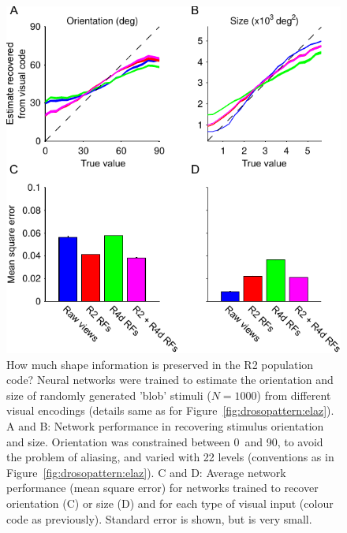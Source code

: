 \begin{figure}
\centering
\includegraphics{figures/orsi}
\caption{How much shape information is preserved in the R2 population code?
Neural networks were trained to estimate the orientation and size of randomly generated 'blob' stimuli ($N=1000$) from different visual encodings (details same as for Figure~\ref{fig:drosopattern:elaz}).
A and B: Network performance in recovering stimulus orientation and size. Orientation was constrained between 0\degree\ and 90\degree, to avoid the problem of aliasing, and varied with 22 levels (conventions as in Figure~\ref{fig:drosopattern:elaz}).
C and D: Average network performance (mean square error) for networks trained to recover orientation (C) or size (D) and for each type of visual input (colour code as previously). Standard error is shown, but is very small.
}
\label{fig:orsi}
\end{figure}
